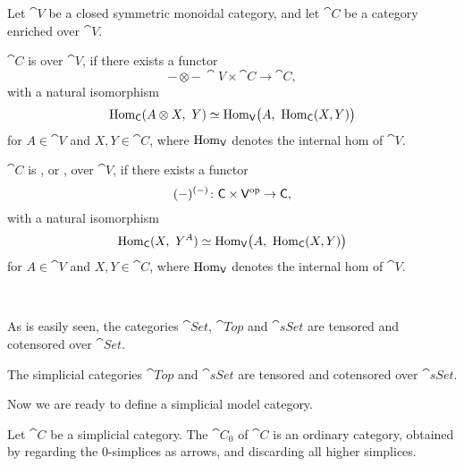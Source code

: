 \begin{definition}
    Let $\cat{V}$ be a closed symmetric monoidal category,
    and let $\cat{C}$ be a category enriched over $\cat{V}$.
    \begin{itms}
        \item $\cat{C}$ is  over $\cat{V}$,
        if there exists a functor
        \[ {-}\otimes{-} \: \cat{V}\times\cat{C} \to \cat{C}, \]
        with a natural isomorphism
        \[ \operatorname{Hom}_{\mathsf{C}}(A\otimes X,\ Y) \simeq \operatorname{Hom}_{\mathsf{V}}\bigl(A,\ \operatorname{Hom}_{\mathsf{C}}(X,Y)\bigr) \]
        for $A\in\cat{V}$ and $X,Y\in\cat{C}$, where $\operatorname{Hom}_{\mathsf{V}}$ denotes the internal hom of $\cat{V}$.

        \item $\cat{C}$ is , or , over $\cat{V}$,
        if there exists a functor
        \[ (-)^{(-)} \colon \mathsf{C} \times \mathsf{V}^{\mathrm{op}} \to \mathsf{C}, \]
        with a natural isomorphism
        \[ \operatorname{Hom}_{\mathsf{C}}(X,\ Y^A) \simeq \operatorname{Hom}_{\mathsf{V}}\bigl(A,\ \operatorname{Hom}_{\mathsf{C}}(X,Y)\bigr) \]
        for $A\in\cat{V}$ and $X,Y\in\cat{C}$, where $\operatorname{Hom}_{\mathsf{V}}$ denotes the internal hom of $\cat{V}$.
    \end{itms}
\end{definition}

\begin{example}
    \ 
    \begin{itms}
        \item As is easily seen, the categories $\cat{Set}$, $\cat{Top}$
        and $\cat{sSet}$ are tensored and cotensored over $\cat{Set}$.

        \item The simplicial categories $\cat{Top}$ and $\cat{sSet}$
        are tensored and cotensored over $\cat{sSet}$.
    \end{itms}
\end{example}

Now we are ready to define a simplicial model category.

\begin{definition}
    Let $\cat{C}$ be a simplicial category.
    The  $\cat{C}_0$ of $\cat{C}$ is an ordinary category,
    obtained by regarding the $0$-simplices as arrows,
    and discarding all higher simplices.
\end{definition}

